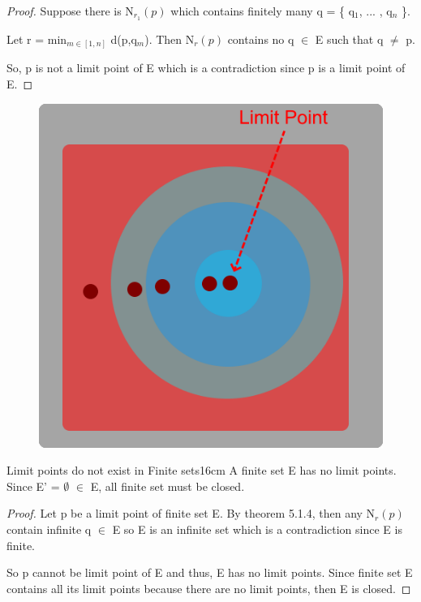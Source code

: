 	\begin{proof}
		Suppose there is N$_{r_1}(p)$ which contains finitely many
		q = \{ q$_1$, ... , q$_n$ \}.

		Let r = min$_{m \in [1,n]}$ d(p,q$_m$). Then N$_r(p)$ contains
		no q $\in$ E such that q $\not =$ p.

		So, p is not a limit point of E which is a contradiction since
		p is a limit point of E.
	\end{proof}



	\begin{figure}[h]
		\centering
		\includegraphics[scale=0.31]{Images/5.1.4.png}
	\end{figure}



	\begin{corollary}{Limit points do not exist in Finite sets}{16cm}
		A finite set E has no limit points.
		Since E' = $\emptyset$ $\in$ E, all finite set must be closed.		
	\end{corollary}
	
	\begin{proof}
		Let p be a limit point of finite set E. By {\color{red} theorem 5.1.4}, 
		then any N$_r(p)$ contain infinite q $\in$ E so E is an infinite set
		which is a contradiction since E is finite.

		So p cannot be limit point of E and thus, E has no limit points.
		Since finite set E contains all its limit points because there are no
		limit points, then E is closed.
	\end{proof}

